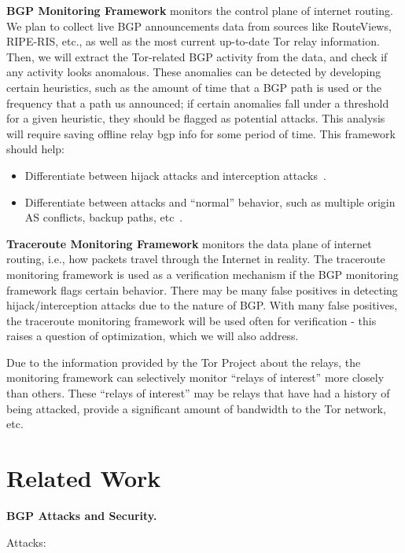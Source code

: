 \documentclass{acm_proc_article-sp}
\begin{document}
{\bf BGP Monitoring Framework} monitors the control plane of internet routing. We plan to collect live BGP announcements data from sources like RouteViews, RIPE-RIS, etc., as well as the most current up-to-date Tor relay information. Then, we will extract the Tor-related BGP activity from the data, and check if any activity looks anomalous.  These anomalies can be detected by developing certain heuristics, such as the amount of time that a BGP path is used or the frequency that a path us announced; if certain anomalies fall under a threshold for a given heuristic, they should be flagged as potential attacks. This analysis will require saving offline relay bgp info for some period of time.  This framework should help:
\begin{itemize}
\item Differentiate between hijack attacks and interception attacks~\cite{ballani2007study}.
\item Differentiate between attacks and ``normal'' behavior, such as multiple origin AS conflicts, backup paths, etc~\cite{zhao2001analysis}.
\end{itemize}

{\bf Traceroute Monitoring Framework} monitors the data plane of internet routing, i.e., how packets travel through the Internet in reality. The traceroute monitoring framework is used as a verification mechanism if the BGP monitoring framework flags certain behavior. There may be many false positives in detecting hijack/interception attacks due to the nature of BGP.  With many false positives, the traceroute monitoring framework will be used often for verification - this raises a question of optimization, which we will also address.

Due to the information provided by the Tor Project about the relays, the monitoring framework can selectively monitor ``relays of interest'' more closely than others.  These ``relays of interest'' may be relays that have had a history of being attacked, provide a significant amount of bandwidth to the Tor network, etc.

\section{Related Work}

{\bf BGP Attacks and Security.}

Attacks:
\cite{ballani2007study}
\cite{mahajan2002understanding}
\cite{zhao2001analysis}
\cite{caesar2005bgp}
\cite{mcarthur2009stealthy}
\end{document}
